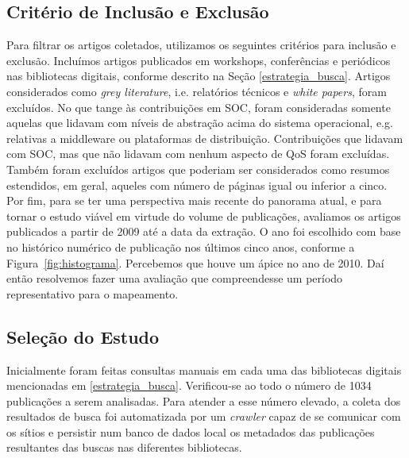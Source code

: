 \subsection{Crit\'{e}rio de Inclusão e Exclusão}

Para filtrar os artigos coletados, utilizamos os seguintes critérios para inclus\~{a}o e exclus\~{a}o. Inclu\'{i}mos artigos publicados em workshops, confer\^{e}ncias e peri\'{o}dicos nas bibliotecas digitais, conforme descrito na Se\c{c}\~{a}o \ref{estrategia_busca}. Artigos considerados como \emph{grey literature}, i.e. relat\'{o}rios t\'{e}cnicos e \emph{white papers}, foram exclu\'{i}dos. No que tange \`{a}s contribui\c{c}\~{o}es em SOC, foram consideradas somente aquelas que lidavam com n\'{i}veis de abstra\c{c}\~{a}o acima do sistema operacional, e.g. relativas a middleware ou plataformas de distribui\c{c}\~{a}o. Contribui\c{c}\~{o}es que lidavam com SOC, mas que n\~{a}o lidavam com nenhum aspecto de QoS foram exclu\'{i}das. Tamb\'{e}m foram exclu\'{i}dos artigos que poderiam ser considerados como resumos estendidos, em geral, aqueles com n\'{u}mero de p\'{a}ginas igual ou inferior a cinco. Por fim, para se ter uma perspectiva mais recente do panorama atual, e para tornar o estudo vi\'{a}vel em virtude do volume de publica\c{c}\~{o}es, avaliamos os artigos publicados a partir de 2009 at\'{e} a data da extra\c{c}\~{a}o. O ano foi escolhido com base no hist\'{o}rico num\'{e}rico de publica\c{c}\~{a}o nos \'{u}ltimos cinco anos, conforme a Figura~\ref{fig:histograma}. Percebemos que houve um \'{a}pice no ano de 2010. Da\'{i} ent\~{a}o resolvemos fazer uma avalia\c{c}\~{a}o que compreendesse um per\'{i}odo representativo para o mapeamento.

\subsection{Seleção do Estudo}

Inicialmente foram feitas consultas manuais em cada uma das bibliotecas digitais mencionadas em \ref{estrategia_busca}. Verificou-se ao todo o número de 1034 publicações a serem analisadas. Para atender a esse número elevado, a coleta dos resultados de busca foi automatizada por um \emph{crawler} capaz de se comunicar com os sítios e persistir num banco de dados local os metadados das publicações resultantes das buscas nas diferentes bibliotecas.

